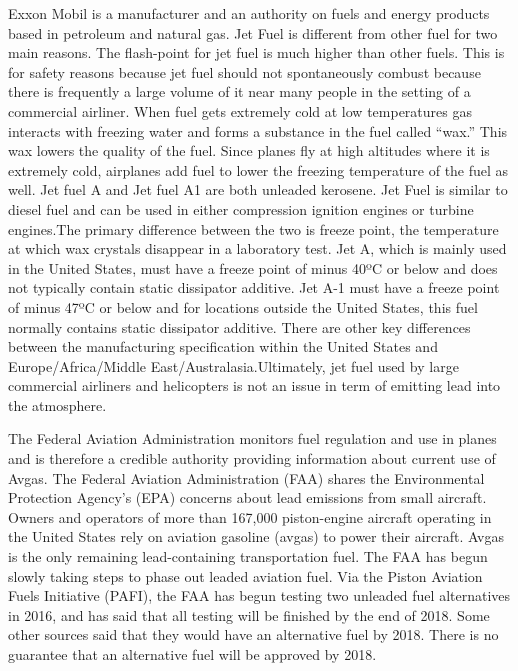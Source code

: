 \documentclass{article}\usepackage[]{graphicx}\usepackage[]{color}
\begin{document}
Exxon Mobil is a manufacturer and an authority on fuels and energy products based in petroleum and natural gas. Jet Fuel is different from other fuel for two main reasons. The flash-point for jet fuel is much higher than other fuels. This is for safety reasons because jet fuel should not spontaneously combust because there is frequently a large volume of it near many people in the setting of a commercial airliner. When fuel gets extremely cold at low temperatures gas interacts with freezing water and forms a substance in the fuel called “wax.” This wax lowers the quality of the fuel. Since planes fly at high altitudes where it is extremely cold, airplanes add fuel to lower the freezing temperature of the fuel as well. Jet fuel A and Jet fuel A1 are both unleaded kerosene. Jet Fuel is similar to diesel fuel and can be used in either compression ignition engines or turbine engines.The primary difference between the two is freeze point, the temperature at which wax crystals disappear in a laboratory test. Jet A, which is mainly used in the United States, must have a freeze point of minus 40ºC or below and does not typically contain static dissipator additive. Jet A-1 must have a freeze point of minus 47ºC or below and for locations outside the United States, this fuel normally contains static dissipator additive. There are other key differences between the manufacturing specification within the United States and Europe/Africa/Middle East/Australasia.Ultimately, jet fuel used by large commercial airliners and helicopters  is not an issue in term of emitting lead into the atmosphere.

\bigskip



The Federal Aviation Administration monitors fuel regulation and use in planes and is therefore a credible authority providing information about current use of Avgas. The Federal Aviation Administration (FAA) shares the Environmental Protection Agency's (EPA) concerns about lead emissions from small aircraft. Owners and operators of more than 167,000 piston-engine aircraft operating in the United States rely on aviation gasoline (avgas) to power their aircraft. Avgas is the only remaining lead-containing transportation fuel. The FAA has begun slowly taking steps to phase out leaded aviation fuel. Via the Piston Aviation Fuels Initiative (PAFI), the FAA has begun testing two unleaded fuel alternatives in 2016, and has said that all testing will be finished by the end of 2018. Some other sources said that they would have an alternative fuel by 2018. There is no guarantee that an alternative fuel will be approved by 2018. 
\end{document}
